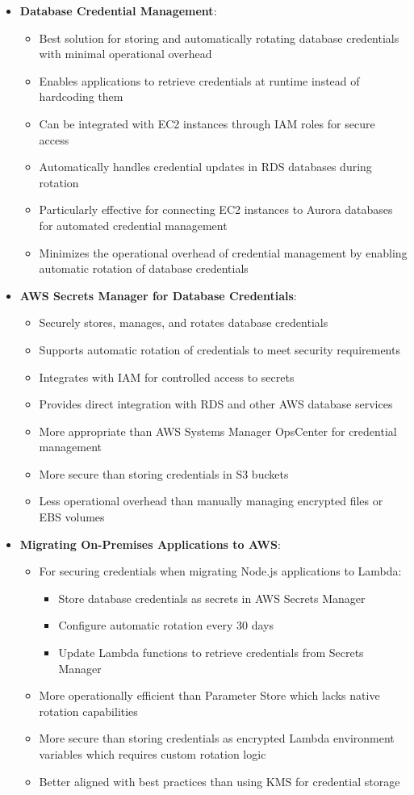 \documentclass[11pt,a4paper]{report}
\begin{document}
\begin{itemize}
  \item \textbf{Database Credential Management}:
\begin{itemize}
  \item Best solution for storing and automatically rotating database credentials with minimal operational overhead
  \item Enables applications to retrieve credentials at runtime instead of hardcoding them
  \item Can be integrated with EC2 instances through IAM roles for secure access
  \item Automatically handles credential updates in RDS databases during rotation
  \item Particularly effective for connecting EC2 instances to Aurora databases for automated credential management
  \item Minimizes the operational overhead of credential management by enabling automatic rotation of database credentials
\end{itemize}
  \item \textbf{AWS Secrets Manager for Database Credentials}:
\begin{itemize}
  \item Securely stores, manages, and rotates database credentials
  \item Supports automatic rotation of credentials to meet security requirements
  \item Integrates with IAM for controlled access to secrets
  \item Provides direct integration with RDS and other AWS database services
  \item More appropriate than AWS Systems Manager OpsCenter for credential management
  \item More secure than storing credentials in S3 buckets
  \item Less operational overhead than manually managing encrypted files or EBS volumes
\end{itemize}
  \item \textbf{Migrating On-Premises Applications to AWS}:
\begin{itemize}
  \item For securing credentials when migrating Node.js applications to Lambda:
\begin{itemize}
  \item Store database credentials as secrets in AWS Secrets Manager
  \item Configure automatic rotation every 30 days
  \item Update Lambda functions to retrieve credentials from Secrets Manager
\end{itemize}
  \item More operationally efficient than Parameter Store which lacks native rotation capabilities
  \item More secure than storing credentials as encrypted Lambda environment variables which requires custom rotation logic
  \item Better aligned with best practices than using KMS for credential storage
\end{itemize}
\end{itemize}
\end{document}

